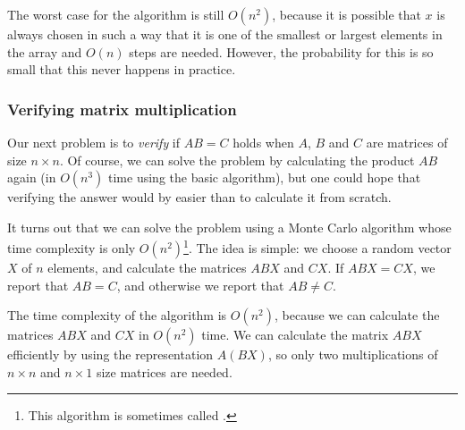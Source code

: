 The worst case for the algorithm is still $O(n^2)$,
because it is possible that $x$ is always chosen
in such a way that it is one of the smallest or largest
elements in the array and $O(n)$ steps are needed.
However, the probability for this is so small
that this never happens in practice.

\subsubsection{Verifying matrix multiplication}


Our next problem is to \emph{verify}
if $AB=C$ holds when $A$, $B$ and $C$
are matrices of size $n \times n$.
Of course, we can solve the problem
by calculating the product $AB$ again
(in $O(n^3)$ time using the basic algorithm),
but one could hope that verifying the
answer would by easier than to calculate it from scratch.

It turns out that we can solve the problem
using a Monte Carlo algorithm whose
time complexity is only $O(n^2)$\footnote{This algorithm is sometimes
called   \cite{fre77}.}.
The idea is simple: we choose a random vector
$X$ of $n$ elements, and calculate the matrices
$ABX$ and $CX$. If $ABX=CX$, we report that $AB=C$,
and otherwise we report that $AB \neq C$.

The time complexity of the algorithm is
$O(n^2)$, because we can calculate the matrices
$ABX$ and $CX$ in $O(n^2)$ time.
We can calculate the matrix $ABX$ efficiently
by using the representation $A(BX)$, so only two
multiplications of $n \times n$ and $n \times 1$
size matrices are needed.

